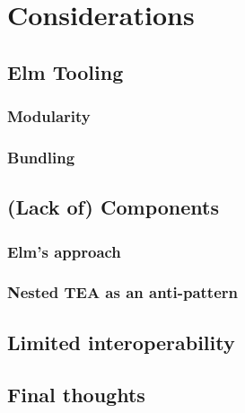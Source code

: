 \chapter{Considerations}

\section{Elm Tooling}
\subsection{Modularity}
\subsection{Bundling}
\section{(Lack of) Components}
\subsection{Elm's approach}
\subsection{Nested TEA as an anti-pattern}
\section{Limited interoperability}
\section{Final thoughts}
